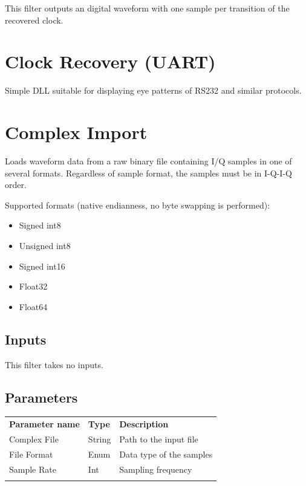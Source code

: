 This filter outputs an digital waveform with one sample per transition of the recovered clock.

\pagebreak
\section{Clock Recovery (UART)}

Simple DLL suitable for displaying eye patterns of RS232 and similar protocols.

\pagebreak
\section{Complex Import}

Loads waveform data from a raw binary file containing I/Q samples in one of several formats. Regardless of sample
format, the samples must be in I-Q-I-Q order.

Supported formats (native endianness, no byte swapping is performed):
\begin{itemize}
\item Signed int8
\item Unsigned int8
\item Signed int16
\item Float32
\item Float64
\end{itemize}

\subsection{Inputs}

This filter takes no inputs.

\subsection{Parameters}

\begin{tabularx}{16cm}{llX}
\thickhline
\textbf{Parameter name} & \textbf{Type} & \textbf{Description} \\
\thickhline
Complex File & String & Path to the input file\\
\thinhline
File Format & Enum & Data type of the samples\\
\thinhline
Sample Rate & Int & Sampling frequency\\
\thickhline
\end{tabularx}

